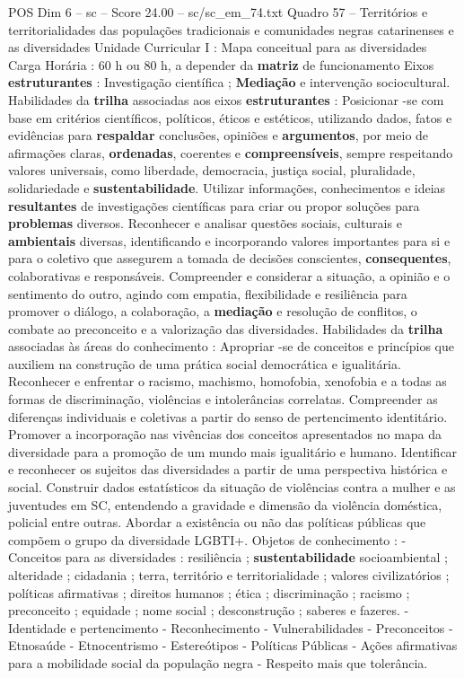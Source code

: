 \begin{textsample}{POS Dim 6 – sc – Score 24.00 – sc/sc\_em\_74.txt}
Quadro 57 – Territórios e territorialidades das populações tradicionais e comunidades negras catarinenses e as diversidades Unidade Curricular I : Mapa conceitual para as diversidades Carga Horária : 60 h ou 80 h, a depender da \textbf{matriz} de funcionamento Eixos \textbf{estruturantes} : Investigação científica ; \textbf{Mediação} e intervenção sociocultural.
Habilidades da \textbf{trilha} associadas aos eixos \textbf{estruturantes} : Posicionar -se com base em critérios científicos, políticos, éticos e estéticos, utilizando dados, fatos e evidências para \textbf{respaldar} conclusões, opiniões e \textbf{argumentos}, por meio de afirmações claras, \textbf{ordenadas}, coerentes e \textbf{compreensíveis}, sempre respeitando valores universais, como liberdade, democracia, justiça social, pluralidade, solidariedade e \textbf{sustentabilidade}.
Utilizar informações, conhecimentos e ideias \textbf{resultantes} de investigações científicas para criar ou propor soluções para \textbf{problemas} diversos.
Reconhecer e analisar questões sociais, culturais e \textbf{ambientais} diversas, identificando e incorporando valores importantes para si e para o coletivo que assegurem a tomada de decisões conscientes, \textbf{consequentes}, colaborativas e responsáveis.
Compreender e considerar a situação, a opinião e o sentimento do outro, agindo com empatia, flexibilidade e resiliência para promover o diálogo, a colaboração, a \textbf{mediação} e resolução de conflitos, o combate ao preconceito e a valorização das diversidades.
Habilidades da \textbf{trilha} associadas às áreas do conhecimento : Apropriar -se de conceitos e princípios que auxiliem na construção de uma prática social democrática e igualitária.
Reconhecer e enfrentar o racismo, machismo, homofobia, xenofobia e a todas as formas de discriminação, violências e intolerâncias correlatas.
Compreender as diferenças individuais e coletivas a partir do senso de pertencimento identitário.
Promover a incorporação nas vivências dos conceitos apresentados no mapa da diversidade para a promoção de um mundo mais igualitário e humano.
Identificar e reconhecer os sujeitos das diversidades a partir de uma perspectiva histórica e social.
Construir dados estatísticos da situação de violências contra a mulher e as juventudes em SC, entendendo a gravidade e dimensão da violência doméstica, policial entre outras.
Abordar a existência ou não das políticas públicas que compõem o grupo da diversidade LGBTI+.
Objetos de conhecimento : - Conceitos para as diversidades : resiliência ; \textbf{sustentabilidade} socioambiental ; alteridade ; cidadania ; terra, território e territorialidade ; valores civilizatórios ; políticas afirmativas ; direitos humanos ; ética ; discriminação ; racismo ; preconceito ; equidade ; nome social ; desconstrução ; saberes e fazeres. - Identidade e pertencimento - Reconhecimento - Vulnerabilidades - Preconceitos - Etnosaúde - Etnocentrismo - Estereótipos - Políticas Públicas - Ações afirmativas para a mobilidade social da população negra - Respeito mais que tolerância.

\end{textsample}
